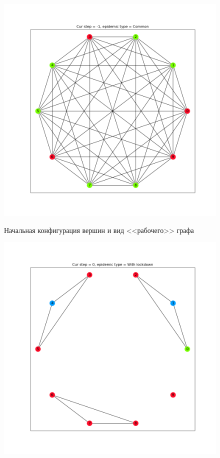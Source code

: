 	\begin{figure}[h]
		\begin{center}
			\begin{minipage}{0.49\linewidth}
				\includegraphics[width=\linewidth, keepaspectratio]{../figs/evidence2/init}
				
				\centering
				Начальная конфигурация вершин и вид <<рабочего>> графа
			\end{minipage}
			\begin{minipage}{0.49\linewidth}
				\includegraphics[width=\linewidth, keepaspectratio]{../figs/evidence2/start_with_ld}
				

\end{minipage}
\end{center}
\end{figure}
